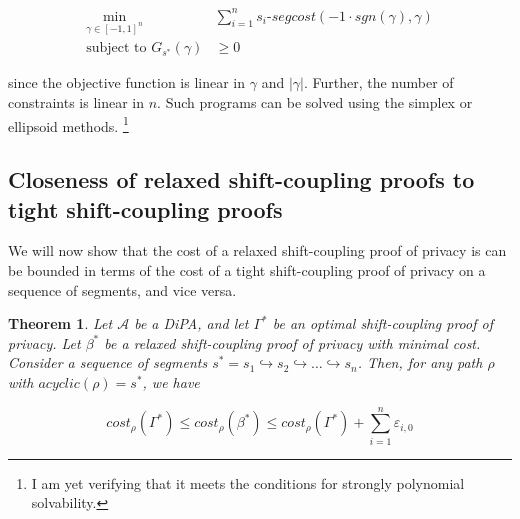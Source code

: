 \documentclass{article}
\newtheorem{theorem}{Theorem}
\renewcommand{\epsilon}{\varepsilon}
\newcommand{\1}{\langle 1 \rangle}
\newcommand{\2}{\langle 2 \rangle}
\begin{document}
\begin{align*}
    \min_{\gamma \in [-1, 1]^n} &\sum_{i = 1}^n s_i\text{-}segcost(-1 \cdot sgn(\gamma), \gamma) \\
    \text{subject to } G_{s^*}(\gamma) &\geq 0
\end{align*}

since the objective function is linear in $\gamma$ and $|\gamma|$. Further, the number of constraints is linear in $n$. Such programs can be solved using the simplex or ellipsoid methods. \footnote{I am yet verifying that it meets the conditions for strongly polynomial solvability.}


\subsection{Closeness of relaxed shift-coupling proofs to tight shift-coupling proofs}

We will now show that the cost of a relaxed shift-coupling proof of privacy is can be bounded in terms of the cost of a tight shift-coupling proof of privacy on a sequence of segments, and vice versa. 

\begin{theorem}
    \label{thm:relaxed_shifts_close}
    Let $\mathcal{A}$ be a DiPA, and let $\Gamma^*$ be an optimal shift-coupling proof of privacy. Let $\beta^*$ be a relaxed shift-coupling proof of privacy with minimal cost. Consider a sequence of segments $s^* = s_1 \hookrightarrow s_2 \hookrightarrow \dots \hookrightarrow s_n$. Then, for any path $\rho$ with $acyclic(\rho) = s^*$, we have

    \[cost_\rho(\Gamma^*) \leq cost_\rho(\beta^*) \leq cost_\rho(\Gamma^*) + \sum_{i = 1}^n \epsilon_{i, 0} \]
\end{theorem}
\end{document}
